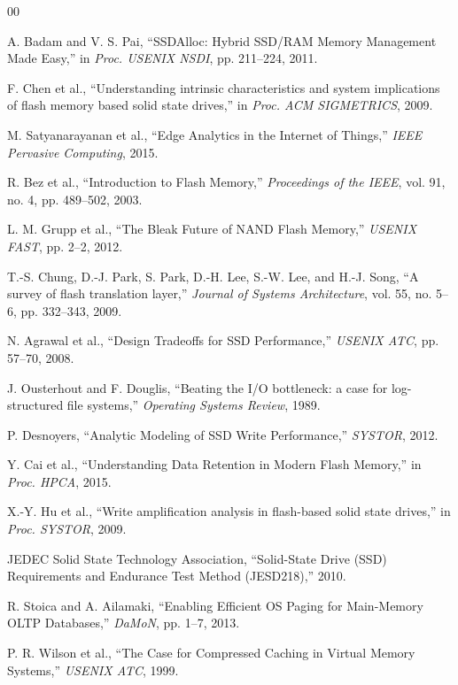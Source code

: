 \documentclass[conference]{IEEEtran}
\begin{document}
\begin{thebibliography}{00}

 A. Badam and V. S. Pai, ``SSDAlloc: Hybrid SSD/RAM Memory Management Made Easy,'' in \textit{Proc. USENIX NSDI}, pp. 211--224, 2011.

 F. Chen et al., ``Understanding intrinsic characteristics and system implications of flash memory based solid state drives,'' in \textit{Proc. ACM SIGMETRICS}, 2009.

 M. Satyanarayanan et al., ``Edge Analytics in the Internet of Things,'' \textit{IEEE Pervasive Computing}, 2015.

 R. Bez et al., ``Introduction to Flash Memory,'' \textit{Proceedings of the IEEE}, vol. 91, no. 4, pp. 489--502, 2003.

 L. M. Grupp et al., ``The Bleak Future of NAND Flash Memory,'' \textit{USENIX FAST}, pp. 2--2, 2012.

 T.-S. Chung, D.-J. Park, S. Park, D.-H. Lee, S.-W. Lee, and H.-J. Song, ``A survey of flash translation layer,'' \textit{Journal of Systems Architecture}, vol. 55, no. 5--6, pp. 332--343, 2009.

 N. Agrawal et al., ``Design Tradeoffs for SSD Performance,'' \textit{USENIX ATC}, pp. 57--70, 2008.

 J. Ousterhout and F. Douglis, ``Beating the I/O bottleneck: a case for log-structured file systems,'' \textit{Operating Systems Review}, 1989.

 P. Desnoyers, ``Analytic Modeling of SSD Write Performance,'' \textit{SYSTOR}, 2012.

 Y. Cai et al., ``Understanding Data Retention in Modern Flash Memory,'' in \textit{Proc. HPCA}, 2015.

 X.-Y. Hu et al., ``Write amplification analysis in flash-based solid state drives,'' in \textit{Proc. SYSTOR}, 2009.

 JEDEC Solid State Technology Association, ``Solid-State Drive (SSD) Requirements and Endurance Test Method (JESD218),'' 2010.

 R. Stoica and A. Ailamaki, ``Enabling Efficient OS Paging for Main-Memory OLTP Databases,'' \textit{DaMoN}, pp. 1--7, 2013.

 P. R. Wilson et al., ``The Case for Compressed Caching in Virtual Memory Systems,'' \textit{USENIX ATC}, 1999.


\end{thebibliography}
\end{document}
